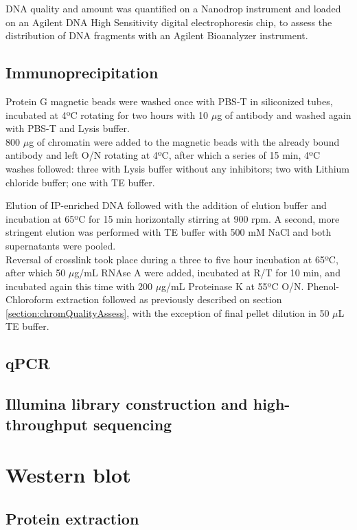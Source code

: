 \documentclass[11pt,twoside,a4paper]{report}
\begin{document}
			DNA quality and amount was quantified on a Nanodrop instrument and loaded on an Agilent DNA High Sensitivity digital electrophoresis chip, to assess the distribution of DNA fragments with an Agilent Bioanalyzer instrument.
			
			\subsection{Immunoprecipitation}
			Protein G magnetic beads were washed once with PBS-T in siliconized tubes, incubated at 4ºC rotating for two hours with 10 $\mu$g of antibody and washed again with PBS-T and Lysis buffer. \\
			
			800 $\mu$g of chromatin were added to the magnetic beads with the already bound antibody and left O/N rotating at 4ºC, after which a series of 15 min, 4ºC washes followed: three with Lysis buffer without any inhibitors; two with Lithium chloride buffer; one with TE buffer.
			
			Elution of IP-enriched DNA followed with the addition of elution buffer and incubation at 65ºC for 15 min horizontally stirring at 900 rpm. A second, more stringent elution was performed with TE buffer with 500 mM NaCl and both supernatants were pooled. \\
			
			Reversal of crosslink took place during a three to five hour incubation at 65ºC, after which 50 $\mu$g/mL RNAse A were added, incubated at R/T for 10 min, and incubated again this time with 200 $\mu$g/mL Proteinase K at 55ºC O/N. Phenol-Chloroform extraction followed as previously described on section \ref{section:chromQualityAssess}, with the exception of final pellet dilution in 50 $\mu$L TE buffer.
			
			\subsection{qPCR}
		
		
			\subsection{Illumina library construction and high-throughput sequencing}
		
	\section{Western blot}
		
		\subsection{Protein extraction}
		
\end{document}
